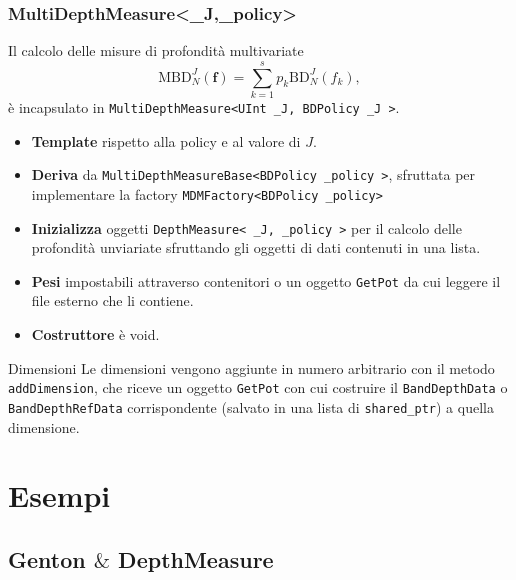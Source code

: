 \documentclass[9pt]{beamer}
\begin{document}
\begin{frame}
\frametitle{\ttfamily MultiDepthMeasure<\_J,\_policy>}
  Il calcolo delle misure di profondità multivariate 
 \[
\text{MBD}^J_N\left( \mathbf{f} \right) = \sum_{k=1}^s p_k \text{BD}^{J}_N   \left(f_{k}\right),
 \]
 \`e incapsulato in \texttt{MultiDepthMeasure<UInt \_J, BDPolicy \_J >}.\\
 
  \begin{itemize}
   \item \textbf{Template} rispetto alla policy e al valore di $J$.
   \item \textbf{Deriva} da \texttt{MultiDepthMeasureBase<BDPolicy \_policy >}, sfruttata per implementare la factory \texttt{MDMFactory<BDPolicy \_policy>}
   \item \textbf{Inizializza} oggetti \texttt{DepthMeasure< \_J, \_policy >} per il calcolo delle profondit\`a unviariate sfruttando gli oggetti di dati contenuti in una lista.
   \item \textbf{Pesi} impostabili attraverso contenitori o un oggetto \texttt{GetPot} da cui leggere il file esterno che li contiene.
   \item \textbf{Costruttore} \`e void.
   \end{itemize}
  
\begin{block}{Dimensioni}
 Le dimensioni vengono aggiunte in numero arbitrario con il metodo \texttt{addDimension}, che riceve un oggetto \texttt{GetPot} con cui costruire il \texttt{BandDepthData} o \texttt{BandDepthRefData}
corrispondente (salvato in una lista di \texttt{shared\_ptr}) a quella dimensione.
\end{block}

 \end{frame}


\section{Esempi}


\subsection{Genton $\&$ DepthMeasure}
\end{document}
